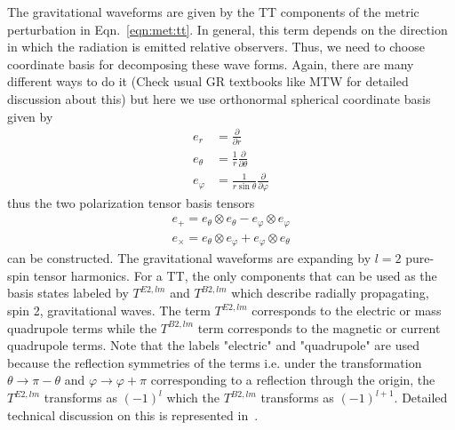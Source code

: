 \documentclass{article}
\begin{document}
The gravitational waveforms are given by the TT components of the metric perturbation
in Eqn.~\ref{eqn:met:tt}. In general, this term depends on the direction in which the radiation
is emitted relative observers. Thus, we need to choose coordinate basis for decomposing
these wave forms. Again, there are many different ways to do it (Check usual GR textbooks like MTW
for detailed discussion about this) but here we use orthonormal spherical coordinate basis given by
\begin{align}
e_r &= \frac{\partial}{\partial r} \\
e_\theta &= \frac{1}{r} \frac{\partial}{\partial \theta} \\
e_\varphi &= \frac{1}{r \sin \theta} \frac{\partial}{\partial \varphi}
\end{align}
thus the two polarization tensor basis tensors
\begin{align}
e_+ = e_\theta \otimes e_\theta - e_\varphi \otimes e_\varphi \\
e_\times = e_\theta \otimes e_\varphi + e_\varphi \otimes e_\theta
\end{align}
can be constructed. The gravitational waveforms are expanding by $l=2$ pure-spin tensor
harmonics. For a TT, the only components that can be used as the basis states labeled
by $T^{E2,lm}$ and $T^{B2,lm}$ which describe radially propagating, spin 2, gravitational
waves. The term $T^{E2,lm}$ corresponds to the electric or mass quadrupole terms while
the $T^{B2,lm}$ term corresponds to the magnetic or current quadrupole terms. 
Note that the labels "electric" and "quadrupole" are used because the reflection symmetries
of the terms i.e. under the transformation $\theta \rightarrow \pi - \theta$ and $\varphi \rightarrow \varphi + \pi$
corresponding to a reflection through the origin, the $T^{E2,lm}$ transforms as $(-1)^l$ which
the $T^{B2,lm}$ transforms as $(-1)^{l+1}$.
Detailed technical discussion on this is represented in~\cite{ThroneRMP1980}.
\end{document}
